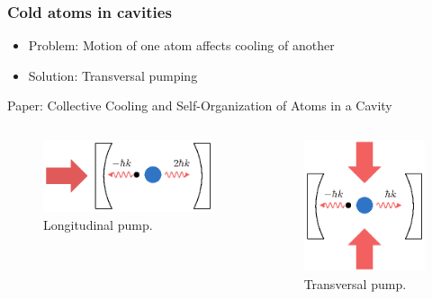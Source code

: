 \documentclass[pdflatex,compress]{beamer}
\begin{document}
\begin{frame}
\frametitle{Cold atoms in cavities}
\begin{itemize}
	\item Problem: Motion of one atom affects cooling of another
	\item Solution: Transversal pumping
\end{itemize}
Paper: Collective Cooling and Self-Organization of Atoms in a Cavity \cite{domokos2002}
\vspace{-2em}
\begin{columns}
\begin{figure}
\centering
\includegraphics[width=1\textwidth]{images/pump_long.eps}
\caption{Longitudinal pump.}
\end{figure}
\begin{figure}
\centering
\includegraphics[width=1\textwidth]{images/pump_trans.eps}
\caption{Transversal pump.}
\end{figure}
\end{columns}
\end{frame}
\end{document}
